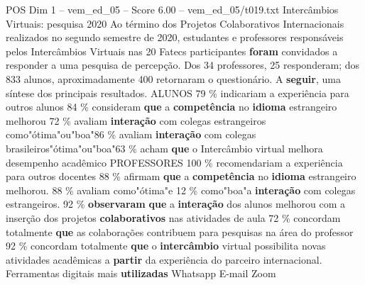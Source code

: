 \begin{textsample}{POS Dim 1 – vem\_ed\_05 – Score 6.00 – vem\_ed\_05/t019.txt}  \label{ex:f1_pos_104}
Intercâmbios Virtuais: pesquisa 2020 Ao término dos Projetos Colaborativos Internacionais realizados no segundo semestre de 2020, estudantes e professores responsáveis pelos Intercâmbios Virtuais nas 20 Fatecs participantes \textbf{foram} convidados a responder a uma pesquisa de percepção.
Dos 34 professores, 25 responderam; dos 833 alunos, aproximadamente 400 retornaram o questionário.
A \textbf{seguir}, uma síntese dos principais resultados.
ALUNOS 79 \% indicariam a experiência para outros alunos 84 \% consideram \textbf{que} a \textbf{competência} no \textbf{idioma} estrangeiro melhorou 72 \% avaliam \textbf{interação} com colegas estrangeiros como"ótima"ou"boa"86 \% avaliam \textbf{interação} com colegas brasileiros"ótima"ou"boa"63 \% acham \textbf{que} o Intercâmbio virtual melhora desempenho acadêmico PROFESSORES 100 \% recomendariam a experiência para outros docentes 88 \% afirmam \textbf{que} a \textbf{competência} no \textbf{idioma} estrangeiro melhorou. 88 \% avaliam como"ótima"e 12 \% como"boa"a \textbf{interação} com colegas estrangeiros. 92 \% \textbf{observaram} \textbf{que} a \textbf{interação} dos alunos melhorou com a inserção dos projetos \textbf{colaborativos} nas atividades de aula 72 \% concordam totalmente \textbf{que} as colaborações contribuem para pesquisas na área do professor 92 \% concordam totalmente \textbf{que} o \textbf{intercâmbio} virtual possibilita novas atividades acadêmicas a \textbf{partir} da experiência do parceiro internacional.
Ferramentas digitais mais \textbf{utilizadas} Whatsapp E-mail Zoom

\end{textsample}
